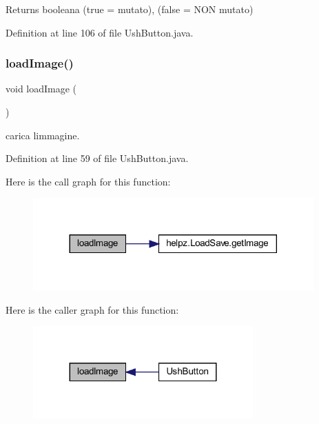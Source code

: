 \begin{DoxyReturn}{Returns}
booleana (true = mutato), (false = N\+ON mutato) 
\end{DoxyReturn}


Definition at line 106 of file Ush\+Button.\+java.

\mbox{\label{classui_1_1_ush_button_aeee4cf1bbe51fdc2f9c344e4c20cee76}} 
\subsubsection{\texorpdfstring{load\+Image()}{loadImage()}}
{\footnotesize\ttfamily void load\+Image (\begin{DoxyParamCaption}{ }\end{DoxyParamCaption})\hspace{0.3cm}{\ttfamily [private]}}



carica l\textquotesingle{}immagine. 



Definition at line 59 of file Ush\+Button.\+java.

Here is the call graph for this function\+:
\nopagebreak
\begin{figure}[H]
\begin{center}
\leavevmode
\includegraphics[width=305pt]{classui_1_1_ush_button_aeee4cf1bbe51fdc2f9c344e4c20cee76_cgraph}
\end{center}
\end{figure}
Here is the caller graph for this function\+:\nopagebreak
\begin{figure}[H]
\begin{center}
\leavevmode
\includegraphics[width=239pt]{classui_1_1_ush_button_aeee4cf1bbe51fdc2f9c344e4c20cee76_icgraph}
\end{center}
\end{figure}
\mbox{\label{classui_1_1_ush_button_a4506144774b5a18385cf2eb0f4ff5e42}} 

